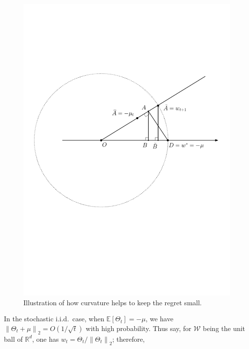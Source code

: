 \documentclass[english]{article}
\newcommand{\cW}{\mathcal{W}}
\newcommand{\Exp}[1]{\mathbb{E}\left[ #1 \right]}
\newcommand{\R}{\mathbb{R}}
\newcommand{\norm}[1]{\left\| #1 \right\|}
\begin{document}
\begin{figure}
	\vspace{-.55cm}
\begin{framed}
	\centering
	\includegraphics[width = \textwidth,
	trim={6.2cm 1cm 1.8cm 0},clip]
	{figures/ExcessError}
	\vspace{-0.4cm}
	\caption{Illustration of how curvature helps to keep the regret small.
	}
	\label{fig:excesserror}
	\vspace{-0.1cm}
\end{framed}
	\vspace{-1.5cm}
\end{figure} 
In the stochastic i.i.d.\ case, when $\Exp{\Theta_t} = -\mu$, we have $\norm{\Theta_t +\mu}_2 = O(1/\sqrt{t})$ with high probability. 
Thus say, for $\cW$ being the unit ball of $\R^d$, one has $w_t = \Theta_t/\norm{\Theta_t}_2$; therefore,
\end{document}
